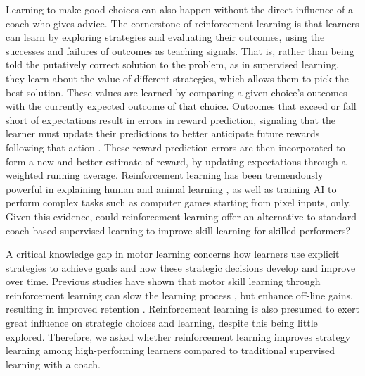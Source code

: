 \documentclass{article}
\begin{document}
Learning to make good choices can also happen without the direct influence of a coach who gives advice. The cornerstone of reinforcement learning \cite{sutton_reinforcement_2018} is that learners can learn by exploring strategies and evaluating their outcomes, using the successes and failures of outcomes as teaching signals. That is, rather than being told the putatively correct solution to the problem, as in supervised learning, they learn about the value of different strategies, which allows them to pick the best solution. These values are learned by comparing a given choice's outcomes with the currently expected outcome of that choice. Outcomes that exceed or fall short of expectations result in errors in reward prediction, signaling that the learner must update their predictions to better anticipate future rewards following that action \cite{rescorla_theory_1972}. These reward prediction errors are then incorporated to form a new and better estimate of reward, by updating expectations through a weighted running average. Reinforcement learning has been tremendously powerful in explaining human and animal learning \cite{waelti_dopamine_2001, schultz_neural_1997, pessiglione_dopamine-dependent_2006}, as well as training AI to perform complex tasks such as computer games starting from pixel inputs, only\cite{mnih_human-level_2015}. Given this evidence, could reinforcement learning offer an alternative to standard coach-based supervised learning to improve skill learning for skilled performers?

A critical knowledge gap in motor learning concerns how learners use explicit strategies to achieve goals and how these strategic decisions develop and improve over time. Previous studies have shown that motor skill learning through reinforcement learning can slow the learning process \cite{lior_shmuelof_overcoming_2012}, but enhance off-line gains, resulting in improved retention \cite{hasson_reinforcement_2015, therrien_effective_2016, lior_shmuelof_overcoming_2012, truong_error-based_2023}. Reinforcement learning is also presumed to exert great influence on strategic choices and learning, despite this being little explored. Therefore, we asked whether reinforcement learning improves strategy learning among high-performing learners compared to traditional supervised learning with a coach. 
\end{document}

